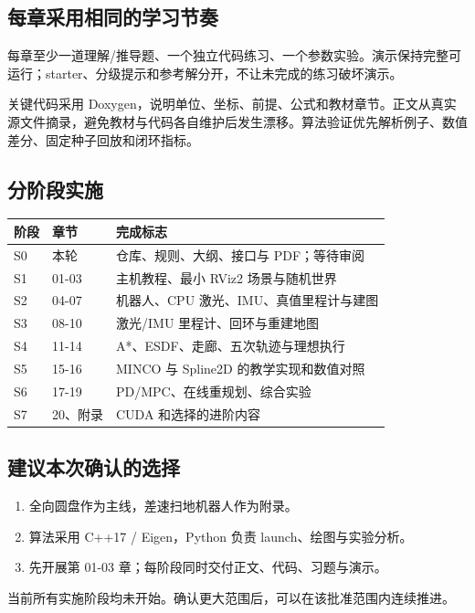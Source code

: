\documentclass[UTF8,fontset=none,a4paper,zihao=5]{ctexart}
\begin{document}
\subsection*{每章采用相同的学习节奏}
\begin{center}
\end{center}
每章至少一道理解/推导题、一个独立代码练习、一个参数实验。演示保持完整可运行；starter、分级提示和参考解分开，不让未完成的练习破坏演示。

关键代码采用 Doxygen，说明单位、坐标、前提、公式和教材章节。正文从真实源文件摘录，避免教材与代码各自维护后发生漂移。算法验证优先解析例子、数值差分、固定种子回放和闭环指标。

\subsection*{分阶段实施}
\begin{tabularx}{\linewidth}{L{13mm}L{23mm}Y}
\toprule
\textbf{阶段} & \textbf{章节} & \textbf{完成标志}\\
\midrule
S0 & 本轮 & 仓库、规则、大纲、接口与 PDF；等待审阅\\
S1 & 01-03 & 主机教程、最小 RViz2 场景与随机世界\\
S2 & 04-07 & 机器人、CPU 激光、IMU、真值里程计与建图\\
S3 & 08-10 & 激光/IMU 里程计、回环与重建地图\\
S4 & 11-14 & A*、ESDF、走廊、五次轨迹与理想执行\\
S5 & 15-16 & MINCO 与 Spline2D 的教学实现和数值对照\\
S6 & 17-19 & PD/MPC、在线重规划、综合实验\\
S7 & 20、附录 & CUDA 和选择的进阶内容\\
\bottomrule
\end{tabularx}

\subsection*{建议本次确认的选择}
\begin{enumerate}
  \item 全向圆盘作为主线，差速扫地机器人作为附录。
  \item 算法采用 C++17 / Eigen，Python 负责 launch、绘图与实验分析。
  \item 先开展第 01-03 章；每阶段同时交付正文、代码、习题与演示。
\end{enumerate}
当前所有实施阶段均未开始。确认更大范围后，可以在该批准范围内连续推进。
\clearpage
\end{document}
